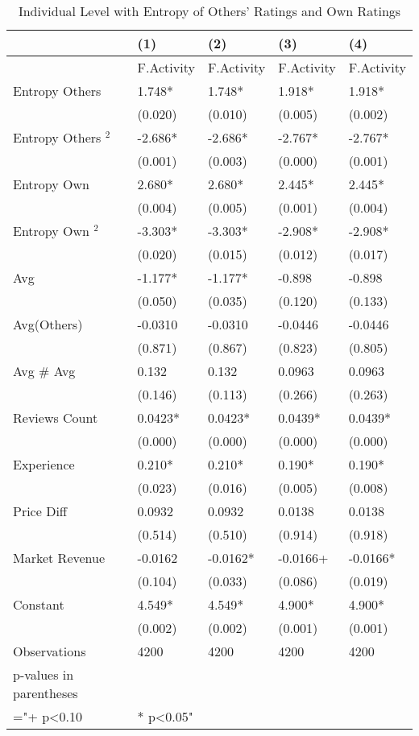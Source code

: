 \begin{table}
\centering
\begin{tabular}{@{}lllll@{}}
\toprule
 & (1) & (2) & (3) & (4) \\ \midrule
 & F.Activity & F.Activity & F.Activity & F.Activity \\
Entropy Others & 1.748* & 1.748* & 1.918* & 1.918* \\
 & (0.020) & (0.010) & (0.005) & (0.002) \\
Entropy Others  $^2$  & -2.686* & -2.686* & -2.767* & -2.767* \\
 & (0.001) & (0.003) & (0.000) & (0.001) \\
Entropy Own & 2.680* & 2.680* & 2.445* & 2.445* \\
 & (0.004) & (0.005) & (0.001) & (0.004) \\
Entropy Own  $^2$  & -3.303* & -3.303* & -2.908* & -2.908* \\
 & (0.020) & (0.015) & (0.012) & (0.017) \\
Avg & -1.177* & -1.177* & -0.898 & -0.898 \\
 & (0.050) & (0.035) & (0.120) & (0.133) \\
Avg(Others) & -0.0310 & -0.0310 & -0.0446 & -0.0446 \\
 & (0.871) & (0.867) & (0.823) & (0.805) \\
Avg \# Avg & 0.132 & 0.132 & 0.0963 & 0.0963 \\
 & (0.146) & (0.113) & (0.266) & (0.263) \\
Reviews Count & 0.0423* & 0.0423* & 0.0439* & 0.0439* \\
 & (0.000) & (0.000) & (0.000) & (0.000) \\
Experience & 0.210* & 0.210* & 0.190* & 0.190* \\
 & (0.023) & (0.016) & (0.005) & (0.008) \\
Price Diff & 0.0932 & 0.0932 & 0.0138 & 0.0138 \\
 & (0.514) & (0.510) & (0.914) & (0.918) \\
Market Revenue & -0.0162 & -0.0162* & -0.0166+ & -0.0166* \\
 & (0.104) & (0.033) & (0.086) & (0.019) \\
Constant & 4.549* & 4.549* & 4.900* & 4.900* \\
 & (0.002) & (0.002) & (0.001) & (0.001) \\
Observations & 4200 & 4200 & 4200 & 4200 \\
p-values in parentheses &  &  &  &  \\
="+ p\textless{}0.10 & * p\textless{}0.05" &  &  &  \\ \bottomrule
\end{tabular}
\caption{Individual Level with Entropy of Others' Ratings and Own Ratings }
\label{reg_ind_12}
\end{table}
